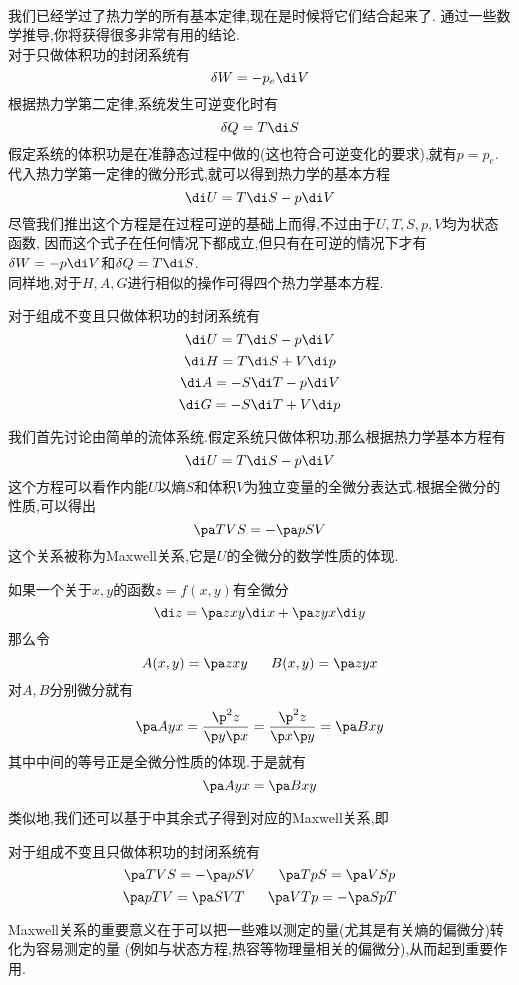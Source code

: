 \documentclass{ctexart}
\begin{document}
\pagestyle{plain}
\noindent{}\vspace{15pt}\\
我们已经学过了热力学的所有基本定律,现在是时候将它们结合起来了.%
通过一些数学推导,你将获得很多非常有用的结论.\vspace{12pt}\\
\indent 对于只做体积功的封闭系统有
\[\delta W=-p_e\di V\]
根据热力学第二定律,系统发生可逆变化时有
\[\delta Q=T\di S\]
假定系统的体积功是在准静态过程中做的(这也符合可逆变化的要求),就有$p=p_e$.%
代入热力学第一定律的微分形式,就可以得到热力学的基本方程
\[\di U=T\di S-p\di V\]
尽管我们推出这个方程是在过程可逆的基础上而得,不过由于$U,T,S,p,V$均为状态函数,%
因而这个式子在任何情况下都成立,但只有在可逆的情况下才有$\delta W=-p\di V$和$\delta Q=T\di S$.\\
\indent 同样地,对于$H,A,G$进行相似的操作可得四个热力学基本方程.
\begin{theorem}[3F.1.1 热力学基本方程]
    对于组成不变且只做体积功的封闭系统有
    \[\di U=T\di S-p\di V\]
    \[\di H=T\di S+V\di p\]
    \[\di A=-S\di T-p\di V\]
    \[\di G=-S\di T+V\di p\]

\end{theorem}\vspace{8pt}
\indent 我们首先讨论由简单的流体系统.假定系统只做体积功,那么根据热力学基本方程有
\[\di U=T\di S-p\di V\]
这个方程可以看作内能$U$以熵$S$和体积$V$为独立变量的全微分表达式.根据全微分的性质,可以得出
\[\pa TVS=-\pa pSV\]
这个关系被称为Maxwell关系,它是$U$的全微分的数学性质的体现.
\begin{hint}
    如果一个关于$x,y$的函数$z=f(x,y)$有全微分
    \[\di z=\pa zxy\di x+\pa zyx\di y\]
    那么令
    \[A(x,y)=\pa zxy\ \ \ \ \ B(x,y)=\pa zyx\]
    对$A,B$分别微分就有
    \[\pa Ayx=\dfrac{\p^2 z}{\p y\p x}=\dfrac{\p^2 z}{\p x\p y}=\pa Bxy\]
    其中中间的等号正是全微分性质的体现.于是就有
    \[\pa Ayx=\pa Bxy\]

\end{hint}
类似地,我们还可以基于中其余式子得到对应的Maxwell关系,即
\begin{theorem}[3F.2.1 Maxwell关系]
    对于组成不变且只做体积功的封闭系统有
    \[\pa TVS=-\pa pSV\ \ \ \ \ \pa TpS=\pa VSp\]
    \[\pa pTV=\pa SVT\ \ \ \ \ \pa VTp=-\pa SpT\]

\end{theorem}
Maxwell关系的重要意义在于可以把一些难以测定的量(尤其是有关熵的偏微分)转化为容易测定的量%
(例如与状态方程,热容等物理量相关的偏微分),从而起到重要作用.\vspace{4pt}\\
\end{document}

